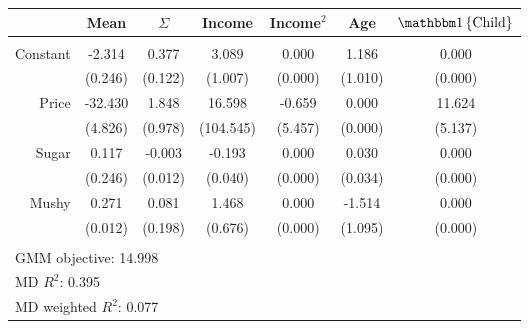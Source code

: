 \begin{tabular}{r|cccccc}
 & Mean & $\Sigma$ & Income & Income$^2$ & Age & $\one{\text{Child}}$ \\\hline &&&&&&\\ 
Constant   & -2.314 & 0.377  & 3.089  & 0.000 & 1.186 & 0.000\\ 
 & (0.246) & (0.122)  & (1.007)  & (0.000) & (1.010) &(0.000) \\ 
Price & -32.430 & 1.848  & 16.598  & -0.659 & 0.000 & 11.624 \\ 
 & (4.826) & (0.978)  & (104.545)  & (5.457) & (0.000) &(5.137) \\ 
Sugar & 0.117 & -0.003  & -0.193  & 0.000 & 0.030 & 0.000 \\ 
 & (0.246) & (0.012)  & (0.040)  & (0.000) & (0.034) &(0.000) \\ 
Mushy & 0.271 & 0.081  & 1.468  & 0.000 & -1.514 & 0.000 \\ 
 & (0.012) & (0.198)  & (0.676)  & (0.000) & (1.095) &(0.000) \\ 
 &&&&&& \\ 
\multicolumn{7}{l}{GMM objective: 14.998} \\ 
\multicolumn{7}{l}{MD $R^2$: 0.395} \\ 
\multicolumn{7}{l}{MD weighted $R^2$: 0.077} \\\hline 
\end{tabular}
